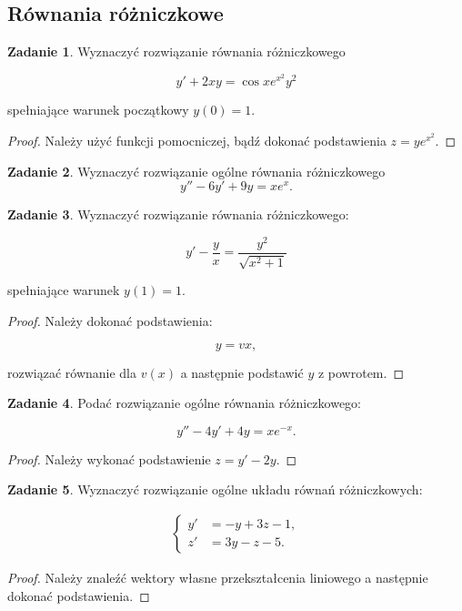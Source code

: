 \documentclass[11pt]{article}
\theoremstyle{definition}
\newtheorem{zadanie}{Zadanie}
\begin{document}

\subsection{Równania różniczkowe}

\begin{zadanie}
Wyznaczyć rozwiązanie równania różniczkowego

$$y' +2xy=\cos x e^{x^2}y^2$$

spełniające warunek początkowy $y(0)=1$.
\end{zadanie}
\begin{proof}
    Należy użyć funkcji pomocniczej, bądź dokonać podstawienia $z=ye^{x^2}$.
\end{proof}

\begin{zadanie}
Wyznaczyć rozwiązanie ogólne równania różniczkowego
$$y''-6y'+9y = xe^x.$$
\end{zadanie}

\begin{zadanie}
Wyznaczyć rozwiązanie równania różniczkowego:

$$y' - \frac yx = \frac{y^2}{\sqrt{x^2+1}}$$

spełniające warunek $y(1)=1$.
\end{zadanie}
\begin{proof}
Należy dokonać podstawienia:

$$y = vx,$$

rozwiązać równanie dla $v(x)$ a następnie podstawić $y$ z powrotem.
\end{proof}

\begin{zadanie}
Podać rozwiązanie ogólne równania różniczkowego:

$$y'' - 4y' + 4y = xe^{-x}.$$
\end{zadanie}

\begin{proof}
Należy wykonać podstawienie $z = y' - 2y$.
\end{proof}

\begin{zadanie}
Wyznaczyć rozwiązanie ogólne układu równań różniczkowych:

\begin{align*}
    \begin{cases} y'&= -y+3z-1,\\
z'&=3y-z-5.
    \end{cases}
\end{align*}
\end{zadanie}
\begin{proof}
    Należy znaleźć wektory własne przekształcenia liniowego a następnie dokonać podstawienia.
\end{proof}
\end{document}
